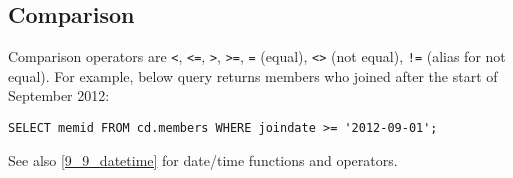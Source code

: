 \color{red}
\subsection{Comparison}
\label{subsection_comparison}%
Comparison operators are \texttt{<}, \texttt{<=}, \texttt{>}, \texttt{>=}, \texttt{=} (equal), \texttt{<>} (not equal), \texttt{!=} (alias for not equal).
For example, below query returns members who joined after the start of September 2012:
\begin{verbatim}
SELECT memid FROM cd.members WHERE joindate >= '2012-09-01';
\end{verbatim}

See also \ref{9_9_datetime} for date/time functions and operators.

